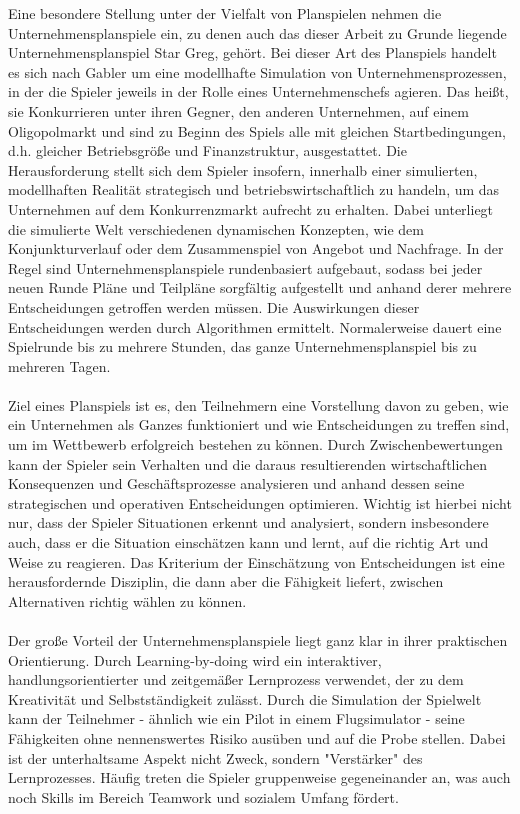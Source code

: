 Eine besondere Stellung unter der Vielfalt von Planspielen nehmen die Unternehmensplanspiele ein, zu denen auch das dieser Arbeit zu Grunde liegende Unternehmensplanspiel Star Greg, gehört. Bei dieser Art des Planspiels handelt es sich nach Gabler um eine modellhafte Simulation von Unternehmensprozessen, in der die Spieler jeweils in der Rolle eines Unternehmenschefs agieren. Das heißt, sie Konkurrieren unter ihren Gegner, den anderen Unternehmen, auf einem Oligopolmarkt und sind zu Beginn des Spiels alle mit gleichen Startbedingungen, d.h. gleicher Betriebsgröße und Finanzstruktur, ausgestattet. Die Herausforderung stellt sich dem Spieler insofern, innerhalb einer simulierten, modellhaften Realität strategisch und betriebswirtschaftlich zu handeln, um das Unternehmen auf dem Konkurrenzmarkt aufrecht zu erhalten. Dabei  unterliegt die simulierte Welt verschiedenen dynamischen Konzepten, wie dem Konjunkturverlauf oder dem Zusammenspiel von Angebot und Nachfrage. In der Regel sind Unternehmensplanspiele rundenbasiert aufgebaut, sodass bei jeder neuen Runde Pläne und Teilpläne sorgfältig aufgestellt und anhand derer mehrere Entscheidungen getroffen werden müssen. Die Auswirkungen dieser Entscheidungen werden durch Algorithmen ermittelt. Normalerweise dauert eine Spielrunde bis zu mehrere Stunden, das ganze Unternehmensplanspiel bis zu mehreren Tagen.
\\
\\
Ziel eines Planspiels ist es, den Teilnehmern eine Vorstellung davon zu geben, wie ein Unternehmen als Ganzes funktioniert und wie Entscheidungen zu treffen sind, um im Wettbewerb erfolgreich bestehen zu können. Durch Zwischenbewertungen kann der Spieler sein Verhalten und die daraus resultierenden wirtschaftlichen Konsequenzen und Geschäftsprozesse analysieren und anhand dessen seine strategischen und operativen Entscheidungen optimieren. Wichtig ist hierbei nicht nur, dass der Spieler Situationen erkennt und analysiert, sondern insbesondere auch, dass er die Situation einschätzen kann und lernt, auf die richtig Art und Weise zu reagieren. Das Kriterium der Einschätzung von Entscheidungen ist eine herausfordernde Disziplin, die dann aber die Fähigkeit liefert, zwischen Alternativen richtig wählen zu können.
\\
\\
Der große Vorteil der Unternehmensplanspiele liegt ganz klar in ihrer praktischen Orientierung. Durch Learning-by-doing wird ein interaktiver, handlungsorientierter und zeitgemäßer Lernprozess verwendet, der zu dem Kreativität und Selbstständigkeit zulässt. Durch die Simulation der Spielwelt kann der Teilnehmer - ähnlich wie ein Pilot in einem Flugsimulator - seine Fähigkeiten ohne nennenswertes Risiko ausüben und auf die Probe stellen. Dabei ist der unterhaltsame Aspekt nicht Zweck, sondern "Verstärker" des Lernprozesses. Häufig treten die Spieler gruppenweise gegeneinander an, was auch noch Skills im Bereich Teamwork und sozialem Umfang fördert. 